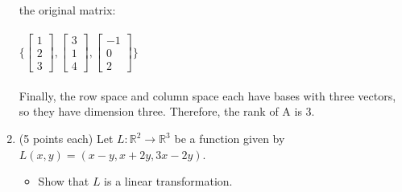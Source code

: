 \documentclass[fleqn]{article}
\begin{document}
\begin{enumerate}
{        the original matrix:
        \\
        \\
        $
          \{ 
            \begin{bmatrix}
              1
              \\
              2
              \\
              3
            \end{bmatrix},
            \begin{bmatrix}
              3
              \\
              1
              \\
              4
            \end{bmatrix},
            \begin{bmatrix}
              -1
              \\
              0
              \\
              2
            \end{bmatrix}
          \} 
        $
        \\
        \\
        Finally, the row space and column space each have bases with three vectors, so they have
        dimension three. Therefore, the rank of A is 3.
      }


    \item (5 points each) Let $L: \mathbb{R}^2 \rightarrow \mathbb{R}^3$ be a function given by $L(x,y)=(x-y, x+2y, 3x-2y)$.
      \begin{itemize}
        \item Show that $L$ is a linear transformation.


\end{itemize}
\end{enumerate}
\end{document}
